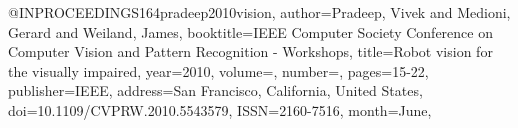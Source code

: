 @INPROCEEDINGS{164pradeep2010vision,
author={Pradeep, Vivek and Medioni, Gerard and Weiland, James},
booktitle={IEEE Computer Society Conference on Computer Vision and Pattern Recognition - Workshops}, 
title={Robot vision for the visually impaired}, 
year={2010},
volume={},
number={},
pages={15-22},
publisher={IEEE},
address={San Francisco, California, United States},
doi={10.1109/CVPRW.2010.5543579},
ISSN={2160-7516},
month={June},}